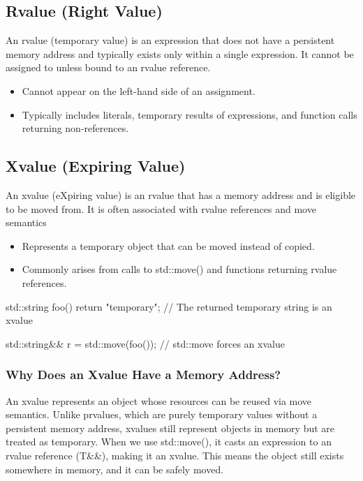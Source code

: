 \documentclass{report}
\begin{document}
\bigbreak \noindent 
\subsection{Rvalue (Right Value)}
\bigbreak \noindent 
An rvalue (temporary value) is an expression that does not have a persistent memory address and typically exists only within a single expression. It cannot be assigned to unless bound to an rvalue reference.
\begin{itemize}
    \item Cannot appear on the left-hand side of an assignment.
    \item Typically includes literals, temporary results of expressions, and function calls returning non-references.
\end{itemize}

\bigbreak \noindent 
\subsection{Xvalue (Expiring Value)}
\bigbreak \noindent 
An xvalue (eXpiring value) is an rvalue that has a memory address and is eligible to be moved from. It is often associated with rvalue references and move semantics
\begin{itemize}
    \item Represents a temporary object that can be moved instead of copied.
    \item Commonly arises from calls to std::move() and functions returning rvalue references.
\end{itemize}
\bigbreak \noindent 
\begin{cppcode}
    std::string foo() {
        return "temporary"; // The returned temporary string is an xvalue
    }

    std::string&& r = std::move(foo()); // std::move forces an xvalue
\end{cppcode}
\bigbreak \noindent 
\subsubsection{Why Does an Xvalue Have a Memory Address?}
\bigbreak \noindent 
An xvalue represents an object whose resources can be reused via move semantics. Unlike prvalues, which are purely temporary values without a persistent memory address, xvalues still represent objects in memory but are treated as temporary.
\bigbreak \noindent 
When we use std::move(), it casts an expression to an rvalue reference (T\&\&), making it an xvalue. This means the object still exists somewhere in memory, and it can be safely moved.
\end{document}
